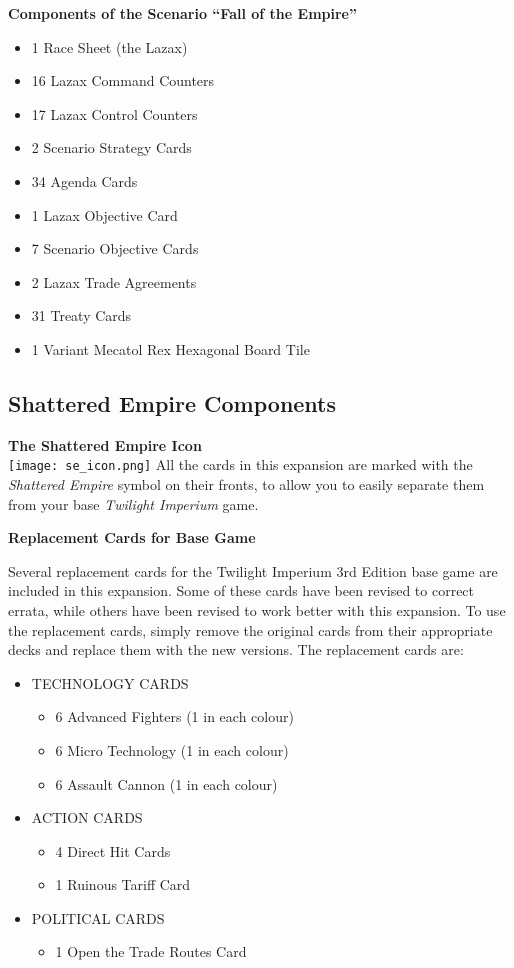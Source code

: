 \documentclass[11pt,fleqn]{book} %
\begin{document}
\begin{STbox}
\textbf{Components of the Scenario “Fall of the Empire”}
\begin{itemize}
\item 1 Race Sheet (the Lazax)
\item 16 Lazax Command Counters
\item 17 Lazax Control Counters
\item 2 Scenario Strategy Cards
\item 34 Agenda Cards
\item 1 Lazax Objective Card
\item 7 Scenario Objective Cards
\item 2 Lazax Trade Agreements
\item 31 Treaty Cards
\item 1 Variant Mecatol Rex Hexagonal Board Tile
\end{itemize}
\end{STbox}

\subsection{Shattered Empire Components}
\begin{SEbox}
\textbf{The Shattered Empire Icon}\\
\texttt{[image: se\_icon.png]}
All the cards in this expansion are marked with the \emph{Shattered Empire} symbol on their fronts, to allow you to easily separate them from your base \emph{Twilight Imperium} game.

\textbf{Replacement Cards for Base Game}

Several replacement cards for the Twilight Imperium 3rd Edition base game are included in this expansion. Some of these cards have been revised to correct errata, while others have been revised to work better with this expansion. To use the replacement cards, simply remove the original cards from their appropriate decks and replace them with the new versions. The replacement cards are:
\begin{itemize}
\item TECHNOLOGY CARDS
\begin{itemize}
\item 6 Advanced Fighters (1 in each colour)
\item 6 Micro Technology (1 in each colour)
\item 6 Assault Cannon (1 in each colour)
\end{itemize}
\item ACTION CARDS
\begin{itemize}
\item 4 Direct Hit Cards
\item 1 Ruinous Tariff Card
\end{itemize}
\item POLITICAL CARDS
\begin{itemize}
\item 1 Open the Trade Routes Card
\end{itemize}
\end{itemize}
\end{SEbox}
\end{document}
